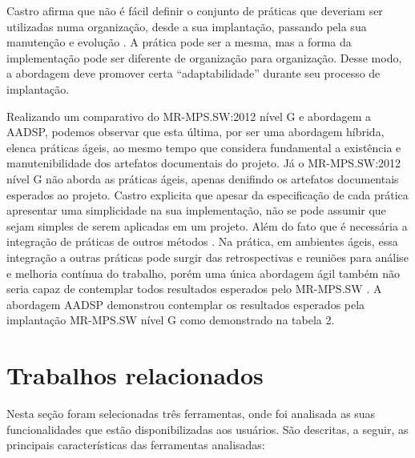 \documentclass{acm_proc_article-sp}
\begin{document}
Castro \cite{Castro:melhoria} afirma que não é fácil definir o conjunto de práticas que deveriam ser utilizadas numa organização, desde a sua implantação, passando pela sua manutenção e evolução \cite{Castro:melhoria}. A prática pode ser a mesma, mas a forma da implementação pode ser diferente de organização para organização. Desse modo, a abordagem deve promover certa “adaptabilidade” durante seu processo de implantação. 

Realizando um comparativo do MR-MPS.SW:2012 nível G e abordagem a AADSP, podemos observar que esta última, por ser uma abordagem híbrida, elenca práticas ágeis, ao mesmo tempo que considera fundamental a existência e manutenibilidade dos artefatos documentais do projeto. Já o MR-MPS.SW:2012 nível G não aborda as práticas ágeis, apenas denifindo os artefatos documentais esperados ao projeto. Castro \cite{Castro:melhoria} explicita que apesar da especificação de cada prática apresentar uma simplicidade na sua implementação, não se pode assumir que sejam simples de serem aplicadas em um projeto. Além do fato que é necessária a integração de práticas de outros métodos \cite{Castro:melhoria}. Na prática, em ambientes ágeis, essa integração a outras práticas pode surgir das retrospectivas e reuniões para análise e melhoria contínua do trabalho, porém uma única abordagem ágil também não seria capaz de contemplar todos resultados esperados pelo MR-MPS.SW \cite{Castro:melhoria}. A abordagem AADSP demonstrou contemplar os resultados esperados pela implantação MR-MPS.SW nível G como demonstrado na tabela 2.


\section{Trabalhos relacionados}
Nesta seção foram selecionadas três ferramentas, onde foi analisada as suas funcionalidades que estão disponibilizadas aos usuários. São descritas, a seguir, as principais características das ferramentas analisadas:
\end{document}
